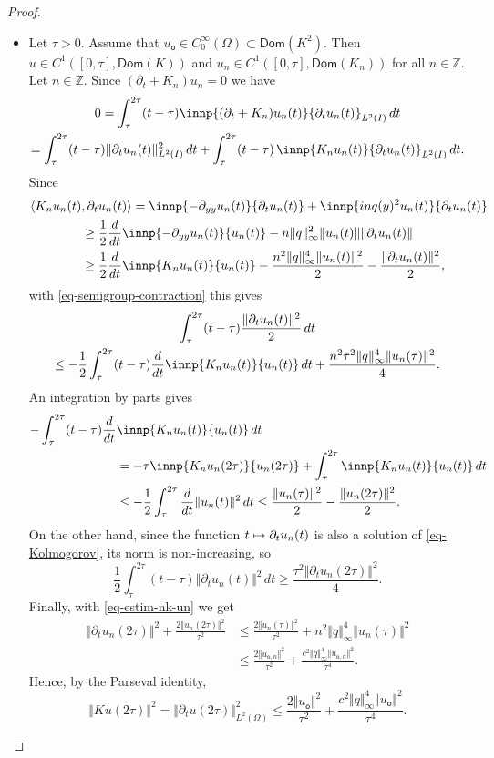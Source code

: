 \documentclass[10pt]{amsart}
\def\mto{\mathchoice{\longmapsto}{\mapsto}{\mapsto}{\mapsto}}
\theoremstyle{plain}
\theoremstyle{definition}
\newcommand{\nr}[1]{\Vert #1\Vert}
\newcommand{\1}{\mathds 1}
\let\Re\relax
\DeclareMathOperator{\Re}{\mathsf{Re}\mkern2mu}
\newcommand{\Dom}{\mathsf{Dom}}
\newcommand{\Z}{\mathbb{Z}}
\let\O\Omega
\newcommand{\uo}{u_{\mathsf{o}}}
\newcommand{\uon}{u_{\mathsf{o},n}}
\begin{document}
\begin{proof}
\begin{itemize}
\item
Let $\tau > 0$. Assume that $\uo \in C_0^\infty(\O) \subset \Dom(K^2)$. Then $u \in C^1([0,\tau], \Dom(K))$ and $u_n \in C^1([0,\tau], \Dom(K_n))$ for all $n \in \Z$. Let $n \in \Z$. Since $(\partial_t + K_n) u_n = 0$ we have
\begin{multline*}
0 = \Re \int_\tau^{2\tau} (t-\tau) \innp{(\partial_t + K_n) u_n(t)}{\partial_t u_n(t)}_{L^2(I)} \, dt\\
= \int_\tau^{2\tau} (t-\tau) \nr{\partial_t u_n(t)}_{L^2(I)}^2 \, dt + \int_\tau^{2\tau} (t-\tau) \, \Re \innp{K_n u_n(t)}{\partial_t u_n(t)}_{L^2(I)} \, dt.
\end{multline*}
Since
\begin{align*}
\Re \langle K_n u_n(t)&,\partial_t u_n(t)\rangle = \Re \innp{-\partial_{yy} u_n(t)}{\partial_t u_n(t)} + \Re \innp{inq(y)^2 u_n(t)}{\partial_t u_n(t)}\\
& \geq \frac 12 \frac d {dt} \innp{-\partial_{yy} u_n(t)}{u_n(t)} - n \nr{q}_\infty^2 \nr{u_n(t)} \nr{\partial_t u_n(t)}\\
& \geq \frac 12 \frac d {dt} \Re \innp{K_n u_n(t)}{u_n(t)} - \frac {n^2 \nr{q}_\infty^4 \nr{u_n(t)}^2}2 - \frac {\nr{\partial_t u_n(t)}^2} 2,
\end{align*}
with \eqref{eq-semigroup-contraction} this gives
\begin{multline*}
\int_{\tau}^{2\tau} (t-\tau) \frac {\nr{\partial_t u_n(t)}^2} 2 \, dt\\
\leq - \frac 12 \Re \int_{\tau}^{2\tau} (t-\tau) \frac d {dt} \innp{K_n u_n(t)}{u_n(t)} \, dt + \frac {n^2 \tau^2 \nr{q}_\infty^4 \nr{u_n(\tau)}^2} 4.
\end{multline*}
An integration by parts gives
\begin{align*}
- \Re \int_\tau^{2\tau} (t-\tau) \frac d {dt}& \innp{K_n u_n(t)}{u_n(t)} \, dt\\
& = - \tau \Re \innp{K_n u_n(2\tau)}{u_n(2\tau)} + \int_\tau^{2\tau} \Re \innp{K_n u_n(t)}{u_n(t)} \, dt\\
& \leq - \frac 12 \int_\tau^{2\tau} \frac d {dt} \nr{u_n(t)}^2 \,dt \leq \frac {\nr{u_n(\tau)}^2} 2 - \frac {\nr{u_n(2\tau)}^2} 2.
\end{align*}
On the other hand, since the function $t \mto \partial_t u_n(t)$ is also a solution of \eqref{eq-Kolmogorov}, its norm is non-increasing, so
\[
\frac 12 \int_\tau^{2\tau} (t-\tau) \nr{\partial_t u_n(t)}^2 \, dt \geq \frac {\tau^2 \nr{\partial_t u_n(2 \tau)}^2} 4.
\]
Finally, with \eqref{eq-estim-nk-un} we get
\begin{align*}
\nr{\partial_t u_n(2 \tau)}^2 + \frac {2 \nr{u_n(2\tau)}^2}{\tau^2}
& \leq \frac {2 \nr{u_n(\tau)}^2}{\tau^2} + n^2 \nr{q}_\infty^4 \nr{u_n(\tau)}^2 \\
& \leq \frac {2 \nr{\uon}^2}{\tau^2} + \frac {c^2 \nr{q}_\infty^4 \nr{\uon}^2}{\tau^4}.
\end{align*}
Hence, by the Parseval identity,
\begin{equation} \label{eq-Ku-tau}
\nr{Ku(2\tau)}^2 = \nr{\partial_t u(2\tau)}_{L^2(\O)}^2 \leq \frac {2 \nr{\uo}^2}{\tau^2} + \frac {c^2 \nr{q}_\infty^4 \nr{\uo}^2}{\tau^4}.
\end{equation}


\end{itemize}
\end{proof}
\end{document}
